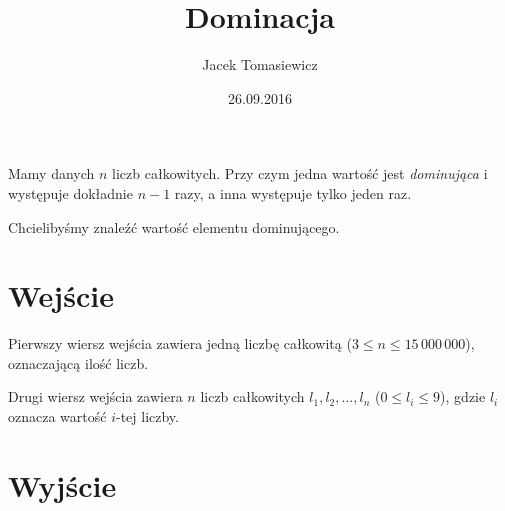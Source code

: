 \documentclass[zad,zawodnik,utf8]{sinol}
\title{Dominacja}
\author{Jacek Tomasiewicz} %
\date{26.09.2016}
\begin{document}
\begin{tasktext}%
Mamy danych $n$ liczb całkowitych. 
Przy czym jedna wartość jest \textit{dominująca} i występuje  dokładnie $n-1$ razy, a inna występuje tylko jeden raz. 

Chcielibyśmy znaleźć wartość elementu dominującego.
  \section{Wejście}
Pierwszy wiersz wejścia zawiera jedną liczbę całkowitą ($3 \leq n \leq 15\,000\,000$), oznaczającą ilość liczb.

Drugi wiersz wejścia zawiera $n$ liczb całkowitych $l_1, l_2, \ldots, l_n$ ($0 \leq l_i \leq 9$), gdzie $l_i$ oznacza wartość $i$-tej liczby.
  \section{Wyjście}
\makecompactexample

\end{tasktext}
\end{document}

